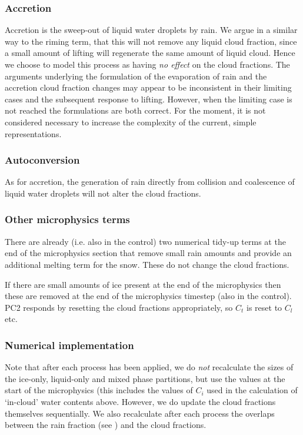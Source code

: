 \documentclass{UMDP_article}
\begin{document}
\subsubsection{Accretion}
Accretion is the sweep-out of liquid water droplets by rain. We argue
in a similar way to the riming term, that this will not remove any liquid
cloud fraction, since a small amount of lifting will regenerate the same
amount of liquid cloud. Hence we choose to model this process as having
\textit{no effect} on the cloud fractions. The arguments underlying the
formulation of the evaporation of rain and the accretion cloud fraction
changes may appear to be inconsistent in their limiting cases and the
subsequent response to lifting. However, when the limiting case is
not reached the formulations are both correct. For the moment, it is
not considered necessary to increase the complexity of the current,
simple representations.

\subsubsection{Autoconversion}
As for accretion, the generation of rain directly from collision
and coalescence of liquid water droplets will not alter the cloud fractions.

\subsubsection{Other microphysics terms}
There are already (i.e. also in the control)
two numerical tidy-up terms at the end of the microphysics
section that remove small rain amounts and provide an additional
melting term for the snow. These do not change the cloud fractions.

If there are small amounts of ice present at the end of the
microphysics then these are removed at the end of the microphysics
timestep (also in the control). PC2 responds by resetting the
cloud fractions appropriately, so $C_t$ is reset to $C_l$ etc.

\subsubsection{Numerical implementation}

Note that after each process has been applied, we do \textit{not}
recalculate the sizes of the ice-only, liquid-only and mixed phase
partitions, but use the values at the start of the microphysics (this
includes the values of $C_i$ used in the calculation of `in-cloud'
water contents above. However, we do update the cloud fractions
themselves sequentially. We also recalculate after each process
the overlaps between the rain fraction (see ) and the cloud fractions.
\end{document}
